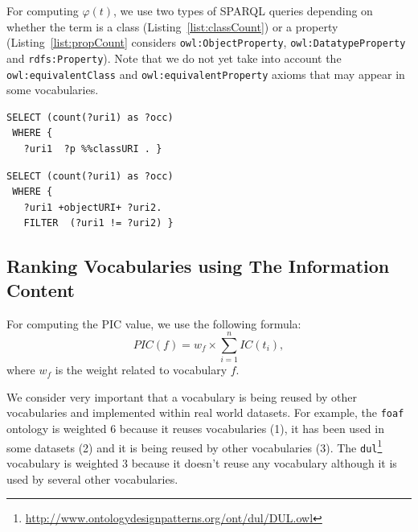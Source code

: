 For computing $\varphi(t)$, we use two types of SPARQL queries depending on whether the term is a class (Listing~\ref{list:classCount}) or a property (Listing~\ref{list:propCount} considers \texttt{owl:ObjectProperty}, \texttt{owl:Data\-typeProperty} and \texttt{rdfs:Property}). Note that we do not yet take into account the \texttt{owl:equivalentClass} and \texttt{owl:equi\-valentProperty} axioms that may appear in some vocabularies.

\begin{lstlisting}[float=htb,caption={SPARQL query for computing the occurrence of a class },label=list:classCount]
 SELECT (count(?uri1) as ?occ)
 WHERE {
   ?uri1  ?p %%classURI . }
\end{lstlisting}

\begin{lstlisting}[float=htb,caption={SPARQL query for computing the occurrence of a property },label=list:propCount]
 SELECT (count(?uri1) as ?occ)
 WHERE {
   ?uri1 +objectURI+ ?uri2.
   FILTER  (?uri1 != ?uri2) }
\end{lstlisting}

\subsection{Ranking Vocabularies using The Information Content}
For computing the PIC value, we use the following formula:
\begin{equation}
 PIC(f) =  w_{f} \times \sum_{i=1}^{n}IC(t_{i})  ,
\end{equation}
where $w_{f}$ is the weight related to vocabulary $f$.

We consider very important that a vocabulary is being reused by other vocabularies and implemented within real world datasets. For example, the \texttt{foaf} ontology is weighted $6$ because it reuses vocabularies (1), it has been used in some datasets (2) and it is being reused by other vocabularies (3). The \texttt{dul}\footnote{\url{http://www.ontologydesignpatterns.org/ont/dul/DUL.owl}} vocabulary is weighted $3$ because it doesn't reuse any vocabulary although it is used by several other vocabularies.

